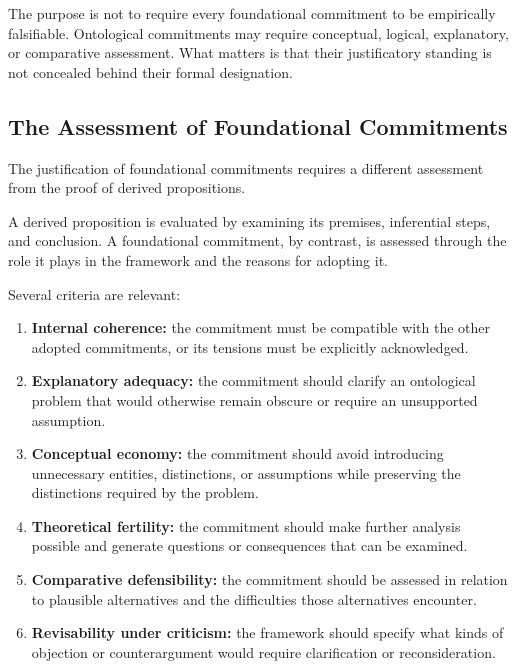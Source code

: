 The purpose is not to require every
foundational commitment to be empirically
falsifiable. Ontological commitments may
require conceptual, logical, explanatory,
or comparative assessment. What matters
is that their justificatory standing
is not concealed behind their formal
designation.

\subsection{The Assessment of Foundational Commitments}

The justification of foundational commitments
requires a different assessment from the
proof of derived propositions.

A derived proposition is evaluated by examining
its premises, inferential steps, and conclusion.
A foundational commitment, by contrast,
is assessed through the role it plays in
the framework and the reasons for adopting it.

Several criteria are relevant:

\begin{enumerate}
    \item \textbf{Internal coherence:} the commitment
    must be compatible with the other adopted
    commitments, or its tensions must be explicitly
    acknowledged.

    \item \textbf{Explanatory adequacy:} the commitment
    should clarify an ontological problem that
    would otherwise remain obscure or require
    an unsupported assumption.

    \item \textbf{Conceptual economy:} the commitment
    should avoid introducing unnecessary entities,
    distinctions, or assumptions while preserving
    the distinctions required by the problem.

    \item \textbf{Theoretical fertility:} the commitment
    should make further analysis possible and
    generate questions or consequences that
    can be examined.

    \item \textbf{Comparative defensibility:} the
    commitment should be assessed in relation
    to plausible alternatives and the difficulties
    those alternatives encounter.

    \item \textbf{Revisability under criticism:}
    the framework should specify what kinds
    of objection or counterargument would
    require clarification or reconsideration.
\end{enumerate}

